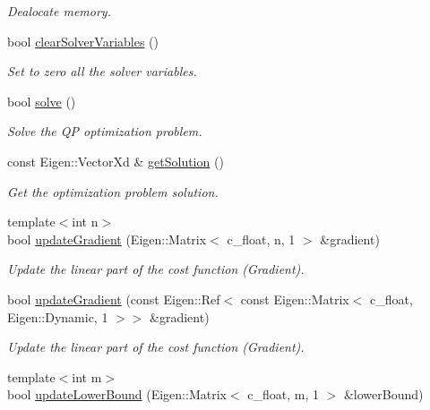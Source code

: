 \begin{DoxyCompactItemize}
\begin{DoxyCompactList}\small\item\em Dealocate memory. \end{DoxyCompactList}\item 
bool \mbox{\hyperlink{classOsqpEigen_1_1Solver_a11605685ef645c991b1f7935d1b854f4}{clear\+Solver\+Variables}} ()
\begin{DoxyCompactList}\small\item\em Set to zero all the solver variables. \end{DoxyCompactList}\item 
bool \mbox{\hyperlink{classOsqpEigen_1_1Solver_aade83b0e68b85d47d41a054f04d413aa}{solve}} ()
\begin{DoxyCompactList}\small\item\em Solve the QP optimization problem. \end{DoxyCompactList}\item 
const Eigen\+::\+Vector\+Xd \& \mbox{\hyperlink{classOsqpEigen_1_1Solver_a192a5f94034d4e467c6b557c2e06dd66}{get\+Solution}} ()
\begin{DoxyCompactList}\small\item\em Get the optimization problem solution. \end{DoxyCompactList}\item 
{\footnotesize template$<$int n$>$ }\\bool \mbox{\hyperlink{classOsqpEigen_1_1Solver_a7d1d9fdd8db3201a0ca2dcafbc289eea}{update\+Gradient}} (Eigen\+::\+Matrix$<$ c\+\_\+float, n, 1 $>$ \&gradient)
\begin{DoxyCompactList}\small\item\em Update the linear part of the cost function (Gradient). \end{DoxyCompactList}\item 
bool \mbox{\hyperlink{classOsqpEigen_1_1Solver_a41efbcc32ccdcf2219b9fe9330faf8ea}{update\+Gradient}} (const Eigen\+::\+Ref$<$ const Eigen\+::\+Matrix$<$ c\+\_\+float, Eigen\+::\+Dynamic, 1 $>$$>$ \&gradient)
\begin{DoxyCompactList}\small\item\em Update the linear part of the cost function (Gradient). \end{DoxyCompactList}\item 
{\footnotesize template$<$int m$>$ }\\bool \mbox{\hyperlink{classOsqpEigen_1_1Solver_a48764153cec5e618021ab79586cc71b6}{update\+Lower\+Bound}} (Eigen\+::\+Matrix$<$ c\+\_\+float, m, 1 $>$ \&lower\+Bound)
$$
\end{DoxyCompactItemize}
